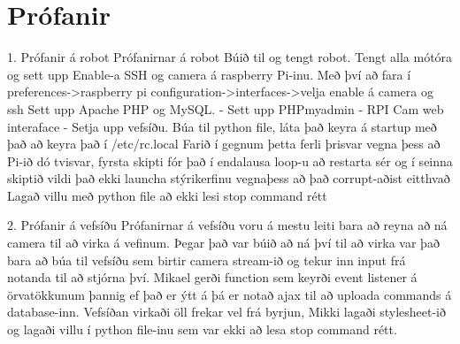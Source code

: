 \section{Prófanir}
1. Prófanir á robot
Prófanirnar á robot 
Búið til og tengt robot.
Tengt alla mótóra og sett upp 
Enable-a SSH og camera á raspberry Pi-inu. Með því að fara í preferences->raspberry pi configuration->interfaces->velja enable á camera og ssh
Sett upp Apache PHP og MySQL. - \cite{stewright}
Sett upp PHPmyadmin - \cite{stewright2}
RPI Cam web interaface - \cite{elinux}
Setja upp vefsíðu.
Búa til python file, láta það keyra á startup með það að keyra það í /etc/rc.local
Farið í gegnum þetta ferli þrisvar vegna þess að Pi-ið dó tvisvar, fyrsta skipti fór það í endalausa  loop-u að restarta sér og í seinna skiptið vildi það ekki launcha stýrikerfinu vegnaþess að það corrupt-aðist eitthvað
Lagað villu með python file að ekki lesi stop command rétt

2. Prófanir á vefsíðu
Prófanirnar á vefsíðu voru á mestu leiti bara að reyna að ná camera til að virka á vefinum. 
Þegar það var búið að ná því til að virka var það bara að búa til vefsíðu sem birtir camera stream-ið og tekur inn input frá notanda til að stjórna því.
Mikael gerði function sem keyrði event listener á örvatökkunum þannig ef það er ýtt á þá er notað ajax til að uploada commands á database-inn.
Vefsíðan virkaði öll frekar vel frá byrjun, Mikki lagaði stylesheet-ið og lagaði villu í python file-inu sem var ekki að lesa stop command rétt.